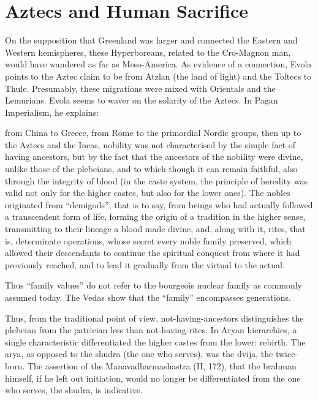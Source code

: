\section{Aztecs and Human Sacrifice}

On the supposition that Greenland was larger and connected the Eastern and Western hemispheres, these Hyperboreans, related to the Cro-Magnon man, would have wandered as far as Meso-America. As evidence of a connection, Evola points to the Aztec claim to be from Atzlan (the land of light) and the Toltecs to Thule. Presumably, these migrations were mixed with Orientals and the Lemurians. Evola seems to waver on the solarity of the Aztecs. In Pagan Imperialism, he explains:

\begin{quotex}
from China to Greece, from Rome to the primordial Nordic groups, then up to the Aztecs and the Incas, nobility was not characterised by the simple fact of having ancestors, but by the fact that the ancestors of the nobility were divine, unlike those of the plebeians, and to which though it can remain faithful, also through the integrity of blood (in the caste system, the principle of heredity was valid not only for the higher castes, but also for the lower ones). The nobles originated from ``demigods'', that is to say, from beings who had actually followed a transcendent form of life, forming the origin of a tradition in the higher sense, transmitting to their lineage a blood made divine, and, along with it, rites, that is, determinate operations, whose secret every noble family preserved, which allowed their descendants to continue the spiritual conquest from where it had previously reached, and to lead it gradually from the virtual to the actual.
\end{quotex}


Thus ``family values'' do not refer to the bourgeois nuclear family as commonly assumed today. The Vedas show that the ``family'' encompasses generations.

\begin{quotex}
Thus, from the traditional point of view, not-having-ancestors distinguishes the plebeian from the patrician less than not-having-rites. In Aryan hierarchies, a single characteristic differentiated the higher castes from the lower: rebirth. The arya, as opposed to the shudra (the one who serves), was the dvija, the twice-born. The assertion of the Manavadharmashastra (II, 172), that the brahman himself, if he left out initiation, would no longer be differentiated from the one who serves, the shudra, is indicative.
\end{quotex}



